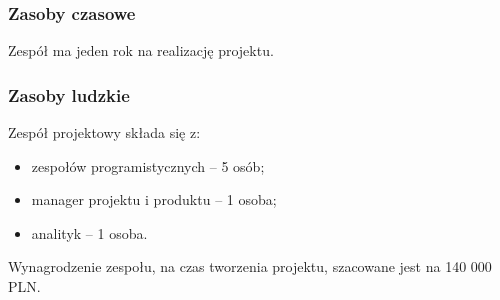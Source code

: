\subsubsection{Zasoby czasowe}
Zespół ma jeden rok na realizację projektu.

\subsubsection{Zasoby ludzkie}
Zespół projektowy składa się z:
\begin{itemize}[nosep]
    \item zespołów programistycznych -- 5 osób;
    \item manager projektu i produktu -- 1 osoba;
    \item analityk -- 1 osoba.
\end{itemize}
Wynagrodzenie zespołu, na czas tworzenia projektu, szacowane jest na 140 000
PLN.
